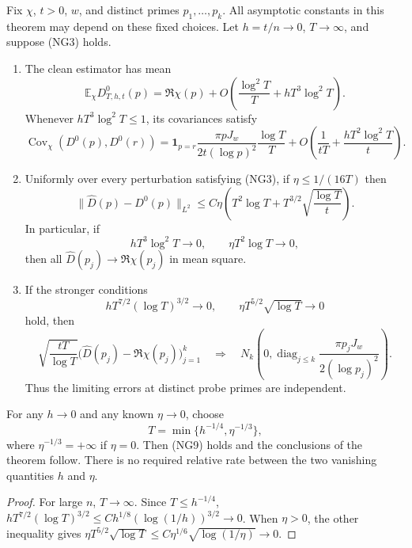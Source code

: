 \begin{theorem}
\label{thm:noisy-grid}
Fix $\chi$, $t>0$, $w$, and distinct primes $p_1,\ldots,p_k$.  All asymptotic
constants in this theorem may depend on these fixed choices.  Let
$h=t/n\to0$, $T\to\infty$, and suppose (NG3) holds.
\begin{enumerate}
\item The clean estimator has mean
\[
 \mathbb E_\chi D^0_{T,h,t}(p)
 =\Re\chi(p)+O\!\left(\frac{\log^2T}{T}
                          +hT^3\log^2T\right).               \tag{NG5}
\]
Whenever $hT^3\log^2T\le1$, its covariances satisfy
\[
 \operatorname{Cov}_\chi(D^0(p),D^0(r))
 =\mathbf1_{p=r}\frac{\pi pJ_w}{2t(\log p)^2}
                    \frac{\log T}{T}
  +O\!\left(\frac1{tT}+\frac{hT^2\log^2T}{t}\right).        \tag{NG6}
\]
\item Uniformly over every perturbation satisfying (NG3), if
$\eta\le1/(16T)$ then
\[
 \|\widehat D(p)-D^0(p)\|_{L^2}
 \le C\eta\left(T^2\log T+
                 T^{3/2}\sqrt{\frac{\log T}{t}}\right).     \tag{NG7}
\]
In particular, if
\[
 hT^3\log^2T\longrightarrow0,
 \qquad \eta T^2\log T\longrightarrow0,                     \tag{NG8}
\]
then all $\widehat D(p_j)\to\Re\chi(p_j)$ in mean square.
\item If the stronger conditions
\[
 hT^{7/2}(\log T)^{3/2}\longrightarrow0,
 \qquad \eta T^{5/2}\sqrt{\log T}\longrightarrow0            \tag{NG9}
\]
hold, then
\[
 \sqrt{\frac{tT}{\log T}}
 \bigl(\widehat D(p_j)-\Re\chi(p_j)\bigr)_{j=1}^k
 \quad\Longrightarrow\quad
 N_k\!\left(0,
  \operatorname{diag}_{j\le k}
       \frac{\pi p_jJ_w}{2(\log p_j)^2}\right).              \tag{NG10}
\]
Thus the limiting errors at distinct probe primes are independent.
\end{enumerate}
\end{theorem}

\begin{corollary}
\label{cor:any-noise}
For any $h\to0$ and any known $\eta\to0$, choose
\[
 T=\min\{h^{-1/4},\eta^{-1/3}\},                            \tag{NG11}
\]
where $\eta^{-1/3}=+\infty$ if $\eta=0$.  Then (NG9) holds and the
conclusions of the theorem follow.  There is no required relative rate
between the two vanishing quantities $h$ and $\eta$.
\end{corollary}

\begin{proof}
For large $n$, $T\to\infty$.  Since $T\le h^{-1/4}$,
$hT^{7/2}(\log T)^{3/2}\le
C h^{1/8}(\log(1/h))^{3/2}\to0$.
When $\eta>0$, the other inequality gives
$\eta T^{5/2}\sqrt{\log T}
\le C\eta^{1/6}\sqrt{\log(1/\eta)}\to0$.
\end{proof}

